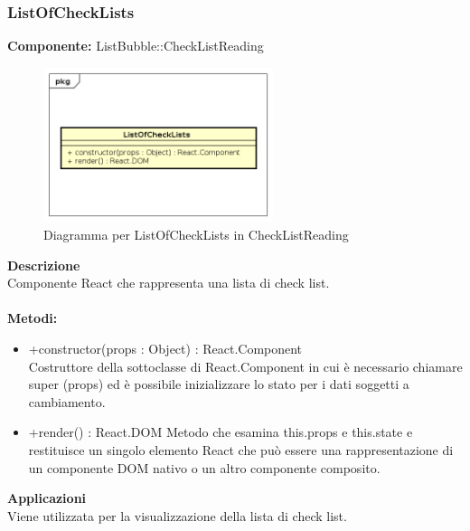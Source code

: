 \subsubsection{ListOfCheckLists}
\textbf{Componente:}  ListBubble::CheckListReading\\
   \FloatBarrier
   \begin{figure}[ht]
   \centering
   \includegraphics[width=0.6\textwidth]{img/single-ListOfCheckLists}
   \caption{{Diagramma per ListOfCheckLists in CheckListReading}}
\end{figure}
\FloatBarrier
\textbf{Descrizione}\\
Componente React che rappresenta una lista di check list.
\\
\\
\textbf{Metodi:} 
\begin{itemize}
\item +constructor(props : Object) : React.Component 
\\
Costruttore della sottoclasse di React.Component in cui è necessario chiamare super (props) ed è possibile inizializzare lo stato per i dati soggetti a cambiamento.

\item +render() : React.DOM
Metodo che esamina this.props e this.state e restituisce un singolo elemento React che può essere una rappresentazione di un componente DOM nativo o un altro componente composito.

\end{itemize} 


\textbf{Applicazioni}\\
Viene utilizzata per la visualizzazione della lista di check list. 


\clearpage

